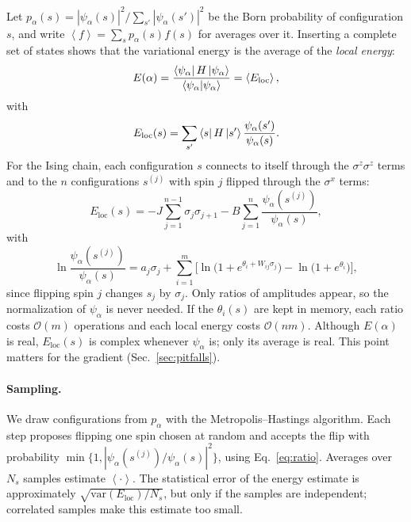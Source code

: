 \documentclass[aps,prb,preprint,amsmath,amssymb,nofootinbib,longbibliography]{revtex4-2}
\newcommand{\ev}[1]{\left\langle #1 \right\rangle}
\newcommand{\Eloc}{E_{\mathrm{loc}}}
\begin{document}
Let $p_\alpha(s) = |\psi_\alpha(s)|^2 / \sum_{s'} |\psi_\alpha(s')|^2$ be the Born probability of configuration $s$,
and write $\ev{f} = \sum_s p_\alpha(s) f(s)$ for averages over it. Inserting a complete set of states shows that the
variational energy is the average of the \emph{local energy}:
\begin{equation}
  E(\alpha) = \frac{\bra{\psi_\alpha}H\ket{\psi_\alpha}}{\braket{\psi_\alpha|\psi_\alpha}} = \ev{\Eloc},
  \label{eq:energy}
\end{equation}
with
\begin{equation}
  \Eloc(s) = \sum_{s'} \bra{s}H\ket{s'} \frac{\psi_\alpha(s')}{\psi_\alpha(s)} .
  \label{eq:eloc-def}
\end{equation}
For the Ising chain, each configuration $s$ connects to itself through the $\sigma^z\sigma^z$ terms and to the $n$
configurations $s^{(j)}$ with spin $j$ flipped through the $\sigma^x$ terms:
\begin{equation}
  \Eloc(s) = -J \sum_{j=1}^{n-1} \sigma_j\sigma_{j+1} - B \sum_{j=1}^{n} \frac{\psi_\alpha(s^{(j)})}{\psi_\alpha(s)} ,
  \label{eq:eloc}
\end{equation}
with
\begin{equation}
  \ln\frac{\psi_\alpha(s^{(j)})}{\psi_\alpha(s)} = a_j\sigma_j + \sum_{i=1}^m \Big[\ln\big(1+e^{\theta_i + W_{ij}
  \sigma_j}\big) - \ln\big(1+e^{\theta_i}\big)\Big],
  \label{eq:ratio}
\end{equation}
since flipping spin $j$ changes $s_j$ by $\sigma_j$. Only ratios of amplitudes appear, so the normalization of
$\psi_\alpha$ is never needed. If the $\theta_i(s)$ are kept in memory, each ratio costs $\mathcal{O}(m)$ operations
and each local energy costs $\mathcal{O}(nm)$. Although $E(\alpha)$ is real, $\Eloc(s)$ is complex whenever
$\psi_\alpha$ is; only its average is real. This point matters for the gradient (Sec.~\ref{sec:pitfalls}).

\paragraph*{Sampling.}
We draw configurations from $p_\alpha$ with the Metropolis--Hastings algorithm.\cite{metropolis1953}
Each step proposes flipping one spin chosen at random and accepts the flip with probability $\min\{1,
|\psi_\alpha(s^{(j)})/\psi_\alpha(s)|^2\}$, using Eq.~\eqref{eq:ratio}. Averages over $N_s$ samples estimate
$\ev{\cdot}$. The statistical error of the energy estimate is approximately $\sqrt{\mathrm{var}(\Eloc)/N_s}$, but only
if the samples are independent; correlated samples make this estimate too small.\cite{flyvbjerg1989}
\end{document}
